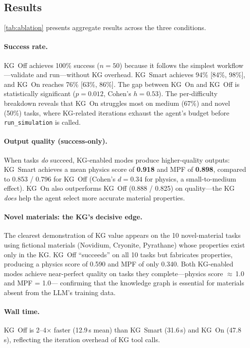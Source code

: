\documentclass[twocolumn]{article}
\begin{document}
\subsection{Results}

\cref{tab:ablation} presents aggregate results across the three
conditions.



\paragraph{Success rate.}
KG~Off achieves 100\% success ($n{=}50$) because it follows the
simplest workflow---validate and run---without KG overhead.
KG~Smart achieves 94\% [84\%, 98\%], and KG~On reaches 76\% [63\%, 86\%].
The gap between KG~On and KG~Off is statistically significant
($p = 0.012$, Cohen's $h = 0.53$).
The per-difficulty breakdown reveals that KG~On struggles most on
medium (67\%) and novel (50\%) tasks, where KG-related iterations
exhaust the agent's budget before \texttt{run\_simulation} is called.

\paragraph{Output quality (success-only).}
When tasks \emph{do} succeed, KG-enabled modes produce
higher-quality outputs:
KG~Smart achieves a mean physics score of \textbf{0.918} and MPF of
\textbf{0.898}, compared to 0.853 / 0.796 for KG~Off
(Cohen's $d = 0.34$ for physics, a small-to-medium effect).
KG~On also outperforms KG~Off (0.888 / 0.825) on quality---the KG
\emph{does} help the agent select more accurate material properties.

\paragraph{Novel materials: the KG's decisive edge.}
The clearest demonstration of KG value appears on the 10 novel-material
tasks using fictional materials (Novidium, Cryonite, Pyrathane) whose
properties exist only in the KG.  KG~Off ``succeeds'' on all 10 tasks
but fabricates properties, producing a physics score of 0.590 and MPF of
only 0.340.  Both KG-enabled modes achieve near-perfect quality on
tasks they complete---physics score $\approx$\,1.0 and MPF = 1.0---
confirming that the knowledge graph is essential for materials absent
from the LLM's training data.

\paragraph{Wall time.}
KG~Off is 2--4$\times$ faster (12.9\,s mean) than KG~Smart (31.6\,s)
and KG~On (47.8\,s), reflecting the iteration overhead of KG tool calls.
\end{document}
